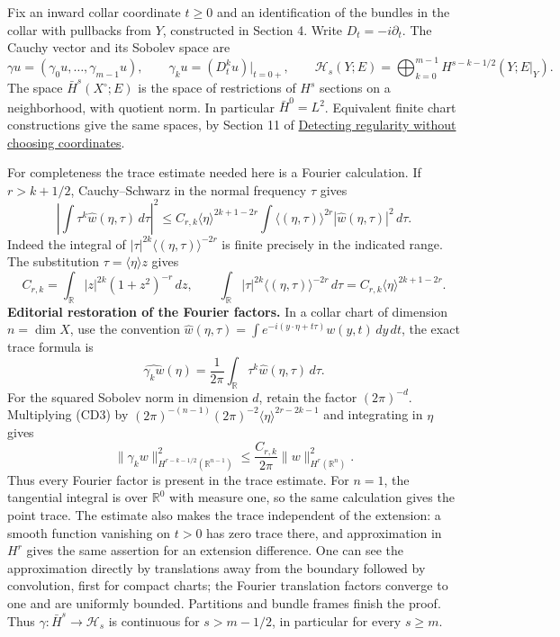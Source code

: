 \documentclass[
  11pt,
]{article}
\begin{document}
Fix an inward collar coordinate \(t\geq0\) and an identification of the
bundles in the collar with pullbacks from \(Y\), constructed in Section
4. Write \(D_t=-i\partial_t\). The Cauchy vector and its Sobolev space
are \[
\gamma u=(\gamma_0u,\ldots,\gamma_{m-1}u),\qquad
\gamma_ku=(D_t^ku)|_{t=0+},\qquad
\mathcal H_s(Y;E)=\bigoplus_{k=0}^{m-1}H^{s-k-1/2}(Y;E|_Y).
\tag{CD2}
\] The space \(\bar H^s(X^\circ;E)\) is the space of restrictions of
\(H^s\) sections on a neighborhood, with quotient norm. In particular
\(\bar H^0=L^2\). Equivalent finite chart constructions give the same
spaces, by Section 11 of
\href{geometric-microlocal-calculus.pdf}{Detecting regularity without
choosing coordinates}.

For completeness the trace estimate needed here is a Fourier
calculation. If \(r>k+1/2\), Cauchy--Schwarz in the normal frequency
\(\tau\) gives \[
\left|\int\tau^k\widehat w(\eta,\tau)\,d\tau\right|^2
\leq C_{r,k}\langle\eta\rangle^{2k+1-2r}
\int\langle(\eta,\tau)\rangle^{2r}|\widehat w(\eta,\tau)|^2\,d\tau.
\tag{CD3}
\] Indeed the integral of \(|\tau|^{2k}\langle(\eta,\tau)\rangle^{-2r}\)
is finite precisely in the indicated range. The substitution
\(\tau=\langle\eta\rangle z\) gives \[
 C_{r,k}=\int_{\mathbb R}|z|^{2k}(1+z^2)^{-r}\,dz,
 \qquad
 \int_{\mathbb R}|\tau|^{2k}\langle(\eta,\tau)\rangle^{-2r}\,d\tau
 =C_{r,k}\langle\eta\rangle^{2k+1-2r}.
\] \textbf{Editorial restoration of the Fourier factors.} In a collar
chart of dimension \(n=\dim X\), use the convention
\(\widehat w(\eta,\tau)=\int e^{-i(y\cdot\eta+t\tau)}w(y,t)\,dy\,dt\),
the exact trace formula is \[
 \widehat{\gamma_kw}(\eta)=\frac1{2\pi}\int_{\mathbb R}\tau^k\widehat w(\eta,\tau)\,d\tau.
\] For the squared Sobolev norm in dimension \(d\), retain the factor
\((2\pi)^{-d}\). Multiplying (CD3) by
\((2\pi)^{-(n-1)}(2\pi)^{-2}\langle\eta\rangle^{2r-2k-1}\) and
integrating in \(\eta\) gives \[
 \|\gamma_kw\|_{H^{r-k-1/2}(\mathbb R^{n-1})}^2
 \leq\frac{C_{r,k}}{2\pi}\|w\|_{H^r(\mathbb R^n)}^2.
 \tag{CD3a}
\] Thus every Fourier factor is present in the trace estimate. For
\(n=1\), the tangential integral is over \(\mathbb R^0\) with measure
one, so the same calculation gives the point trace. The estimate also
makes the trace independent of the extension: a smooth function
vanishing on \(t>0\) has zero trace there, and approximation in \(H^r\)
gives the same assertion for an extension difference. One can see the
approximation directly by translations away from the boundary followed
by convolution, first for compact charts; the Fourier translation
factors converge to one and are uniformly bounded. Partitions and bundle
frames finish the proof. Thus \(\gamma:\bar H^s\to\mathcal H_s\) is
continuous for \(s>m-1/2\), in particular for every \(s\geq m\).
\end{document}
